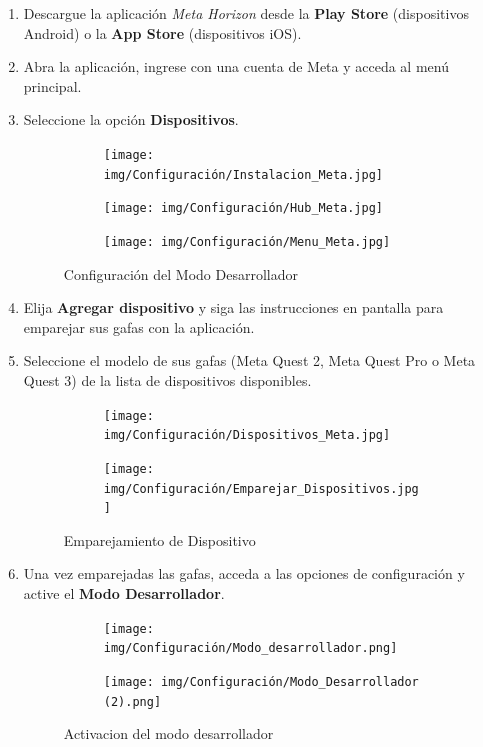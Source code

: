 \begin{enumerate}
    \begin{enumerate}[I]
        \item Descargue la aplicación \textit{Meta Horizon} desde la \textbf{Play Store} (dispositivos Android) o la \textbf{App Store} (dispositivos iOS).  
        \item Abra la aplicación, ingrese con una cuenta de Meta y acceda al menú principal.  
        \item Seleccione la opción \textbf{Dispositivos}.  
        \begin{figure}[thbp]
            \centering
            \begin{subfigure}[b]{0.3\linewidth}
                \texttt{[image: img/Configuración/Instalacion\_Meta.jpg]}
            \end{subfigure}
            \begin{subfigure}[b]{0.3\linewidth}
                \texttt{[image: img/Configuración/Hub\_Meta.jpg]}
            \end{subfigure}
            \begin{subfigure}[b]{0.3\linewidth}
                \texttt{[image: img/Configuración/Menu\_Meta.jpg]}
            \end{subfigure}
            \caption{Configuración del Modo Desarrollador}
        \end{figure}
        \item Elija \textbf{Agregar dispositivo} y siga las instrucciones en pantalla para emparejar sus gafas con la aplicación.  
        \item Seleccione el modelo de sus gafas (Meta Quest 2, Meta Quest Pro o Meta Quest 3) de la lista de dispositivos disponibles.  
        \begin{figure}[thbp]
            \centering
            \begin{subfigure}[b]{0.3\linewidth}
                \texttt{[image: img/Configuración/Dispositivos\_Meta.jpg]}
            \end{subfigure}
            \begin{subfigure}[b]{0.3\linewidth}
                \texttt{[image: img/Configuración/Emparejar\_Dispositivos.jpg]}
            \end{subfigure}
            \caption{Emparejamiento de Dispositivo}
        \end{figure}
        \item Una vez emparejadas las gafas, acceda a las opciones de configuración y active el \textbf{Modo Desarrollador}.  
        \begin{figure}[thbp]
            \centering
            \begin{subfigure}[b]{0.3\linewidth}
                \texttt{[image: img/Configuración/Modo\_desarrollador.png]}
            \end{subfigure}
            \begin{subfigure}[b]{0.3\linewidth}
                \texttt{[image: img/Configuración/Modo\_Desarrollador (2).png]}
            \end{subfigure}
            \caption{Activacion del modo desarrollador}
        \end{figure}
    \end{enumerate}


\end{enumerate}
